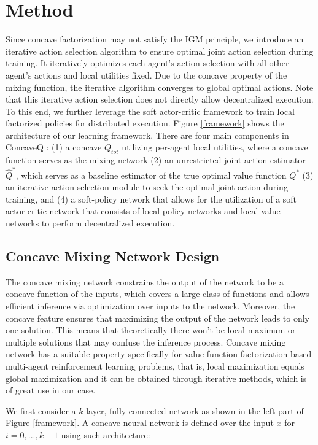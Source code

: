 
\section{Method}
{Since concave factorization may not satisfy the IGM principle, we introduce an iterative action selection algorithm to ensure optimal joint action selection during training. It iteratively optimizes each agent's action selection with all other agent's actions and local utilities fixed. Due to the concave property of the mixing function, the iterative algorithm converges to global optimal actions. 
Note that this iterative action selection does not directly allow decentralized execution. To this end, we further leverage the soft actor-critic framework to train local factorized policies for distributed execution.
Figure \ref{framework} shows the architecture of our learning framework. There are four main
components in ConcaveQ : (1) a concave $Q_{tot}$ utilizing per-agent local utilities, where a concave function serves as the mixing network (2) an unrestricted joint action estimator $\hat{Q}^*$,
which serves as a baseline estimator of the true optimal value function $Q^*$ (3) an iterative action-selection module to seek the optimal joint action during training, and (4) a soft-policy network that allows for the utilization of a soft actor-critic network that consists of local policy networks and local value networks to perform decentralized execution. 




\subsection{Concave Mixing Network Design} 

The concave mixing network constrains the output of the network to be a concave function of the inputs, which covers a large class of functions and allows efficient inference via optimization over inputs to the network. Moreover, the concave feature ensures that maximizing the output of the network leads to only one solution. This means that theoretically there won't be local maximum or multiple solutions that may confuse the inference process. Concave mixing network has a suitable property specifically for value function factorization-based multi-agent reinforcement learning problems, that is, local maximization equals global maximization and it can be obtained through iterative methods, which is of great use in our case.


 We first consider a $k$-layer, fully connected network as shown in the left part of Figure \ref{framework}. A concave neural network is defined over the input $x$ for $i = 0, ...,k - 1$ using such architecture:
\setlength\intextsep{0pt}

}
